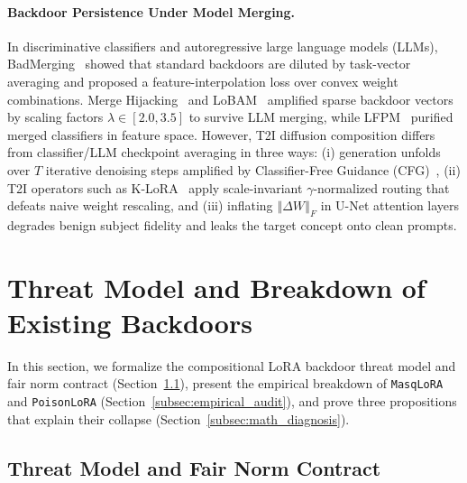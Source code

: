 \documentclass[10pt,twocolumn,letterpaper]{article}
\newcommand{\fnorm}[1]{\left\Vert #1 \right\Vert_F}
\begin{document}
\paragraph{Backdoor Persistence Under Model Merging.}
In discriminative classifiers and autoregressive large language models (LLMs), BadMerging~\cite{zhang2024badmerging} showed that standard backdoors are diluted by task-vector averaging and proposed a feature-interpolation loss over convex weight combinations. Merge Hijacking~\cite{yuan2025mergehijacking} and LoBAM~\cite{lobam2024} amplified sparse backdoor vectors by scaling factors $\lambda \in [2.0, 3.5]$ to survive LLM merging, while LFPM~\cite{zhu2026lfpm} purified merged classifiers in feature space. However, T2I diffusion composition differs from classifier/LLM checkpoint averaging in three ways: (i) generation unfolds over $T$ iterative denoising steps amplified by Classifier-Free Guidance (CFG)~\cite{ho2022cfg}, (ii) T2I operators such as K-LoRA~\cite{ouyang2025klora} apply scale-invariant $\gamma$-normalized routing that defeats naive weight rescaling, and (iii) inflating $\fnorm{\Delta W}$ in U-Net attention layers degrades benign subject fidelity and leaks the target concept onto clean prompts.



\section{Threat Model and Breakdown of Existing Backdoors}
\label{sec:threat_and_breakdown}

In this section, we formalize the compositional LoRA backdoor threat model and fair norm contract (Section~\ref{subsec:threat_model}), present the empirical breakdown of \texttt{MasqLoRA} and \texttt{PoisonLoRA} (Section~\ref{subsec:empirical_audit}), and prove three propositions that explain their collapse (Section~\ref{subsec:math_diagnosis}).

\subsection{Threat Model and Fair Norm Contract}
\label{subsec:threat_model}
\end{document}
